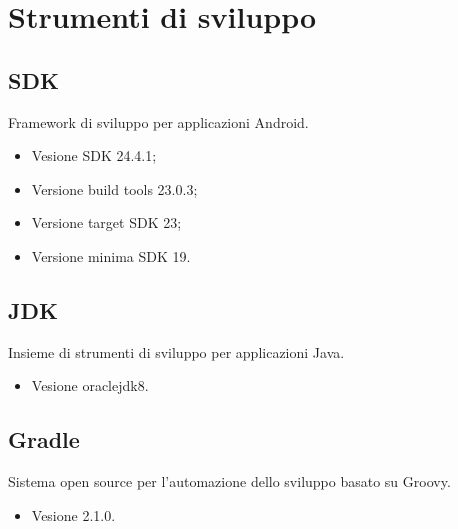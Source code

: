 \documentclass[../ManualeSviluppatore.tex]{subfiles}
\begin{document}
\section{Strumenti di sviluppo}
	\subsection{SDK}
		Framework di sviluppo per applicazioni Android.
		\begin{itemize} 
			\item Vesione SDK 24.4.1;
			\item Versione build tools 23.0.3;
			\item Versione target SDK 23;
			\item Versione minima SDK 19.
		\end{itemize}
	\subsection{JDK}
		Insieme di strumenti di sviluppo per applicazioni Java. 
		\begin{itemize} 
			\item Vesione oraclejdk8.
		\end{itemize}
	\subsection{Gradle}
		Sistema open source per l'automazione dello sviluppo basato su Groovy.
		\begin{itemize} 
			\item Vesione 2.1.0.
		\end{itemize}
\end{document}
